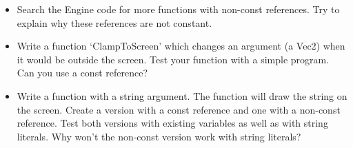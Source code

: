 \begin{exercise}
\begin{itemize}
	\item Search the Engine code for more functions with non-const references. Try to explain why these references are not constant.
	\item Write a function `ClampToScreen' which changes an argument (a Vec2) when it would be outside the screen. Test your function with a simple program. Can you use a const reference?
	\item Write a function with a string argument. The function will draw the string on the screen. Create a version with a const reference and one with a non-const reference. Test both versions with existing  variables as well as with string literals. Why won't the non-const version work with string literals? 
\end{itemize}
\end{exercise}